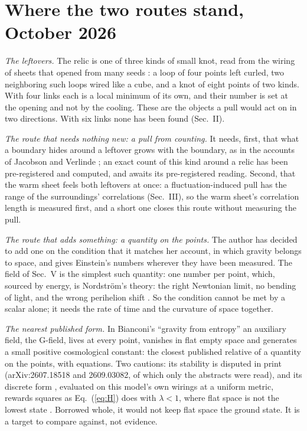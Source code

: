 \documentclass[pre,twocolumn,superscriptaddress,nofootinbib]{revtex4-2}
\begin{document}
\section{Where the two routes stand, October 2026}

\emph{The leftovers.} The relic is one of three kinds of small knot, read from the wiring of sheets that opened from
many seeds \cite{paper2}: a loop of four points left curled, two neighboring such loops wired like a cube, and a knot
of eight points of two kinds. With four links each is a local minimum of its own, and their number is set at the
opening and not by the cooling. These are the objects a pull would act on in two directions. With six links none has
been found (Sec.~II).

\emph{The route that needs nothing new: a pull from counting.} It needs, first, that what a boundary
hides around a leftover grows with the boundary, as in the accounts of Jacobson and Verlinde \cite{Jac95,Ver11}; an
exact count of this kind around a relic has been pre-registered and computed, and awaits its pre-registered reading.
Second, that the warm sheet feels both leftovers at once: a fluctuation-induced pull has the range of the
surroundings' correlations (Sec.~III), so the warm sheet's correlation length is measured first, and a short one
closes this route without measuring the pull.

\emph{The route that adds something: a quantity on the points.} The author has decided to add one on the condition
that it matches her account, in which gravity belongs to space, and gives Einstein's numbers wherever they have been
measured. The field of Sec.~V is the simplest such quantity: one number per point, which, sourced by energy, is
Nordstr\"om's theory: the right Newtonian limit, no bending of light, and the wrong perihelion
shift \cite{Giulini}. So the condition cannot be met by a scalar alone; it needs the rate of time and the curvature
of space together.

\emph{The nearest published form.} In Bianconi's ``gravity from entropy'' \cite{Bia25} an auxiliary field, the
G-field, lives at every point, vanishes in flat empty space and generates a small positive cosmological constant: the
closest published relative of a quantity on the points, with equations. Two cautions: its
stability is disputed in print (arXiv:2607.18518 and 2609.03082, of which only the abstracts were read), and its
discrete form \cite{Bia24}, evaluated on this model's own wirings at a uniform metric, rewards squares as
Eq.~(\ref{eq:H}) does with $\lambda < 1$, where flat space is not the lowest state \cite{paper10}. Borrowed whole, it
would not keep flat space the ground state. It is a target to compare against, not evidence.
\end{document}
